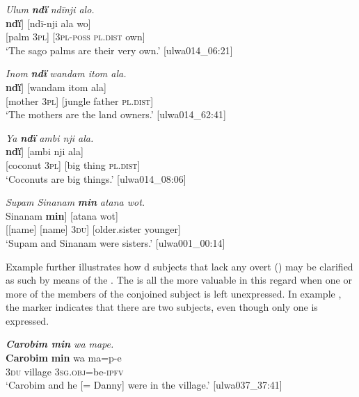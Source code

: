 \ea%
    \label{ex:det:13}
          \textit{Ulum} \textbf{\textit{ndï}} \textit{ndïnji alo.}\\
\gll    {[ulum}  {\textbf{ndï}]}  {[ndï-nji}  ala      {wo]}\\
    {[palm}  {3\textsc{pl}]}  {[3\textsc{pl-poss}}  \textsc{pl.dist}  {own]}\\
\glt    ‘The sago palms are their very own.’ [ulwa014\_06:21]
\z

\ea%
    \label{ex:det:14}
          \textit{Inom} \textbf{\textit{ndï}} \textit{wandam itom ala.}\\
\gll    {[inom}    {\textbf{ndï}]}  {[wandam}  itom  {ala]}\\
    {[mother}  {3\textsc{pl}]}  {[jungle}    father  {\textsc{pl.dist]}}\\
\glt `The mothers are the land owners.’ [ulwa014\_62:41]
\z

\ea%
    \label{ex:det:15}
          \textit{Ya} \textbf{\textit{ndï}} \textit{ambi nji ala.}\\
\gll    {[ya}      {\textbf{ndï}]}  {[ambi}   nji    {ala]}\\
    {[coconut}  {3\textsc{pl]}}  {[big}  thing  {\textsc{pl.dist]}}\\
\glt `Coconuts are big things.’ [ulwa014\_08:06]
\z

\ea%
    \label{ex:det:16}
          \textit{Supam Sinanam} \textbf{\textit{min}} \textit{atana wot.}\\
\gll    {[Supam}  Sinanam  {\textbf{min}]}  {[atana}      {wot]}\\
    {[[name]}  {[name]}    {3\textsc{du]}}  {[older.sister}  {younger]}\\
\glt `Supam and Sinanam were sisters.’ [ulwa001\_00:14]
\z

Example  further illustrates how d subjects that lack any overt  () may be clarified as such by means of the . The  is all the more valuable in this regard when one or more of the members of the conjoined subject is left unexpressed. In example , the  marker indicates that there are two subjects, even though only one is expressed.




\ea%
    \label{ex:det:17}
          \textit{\textbf{Carobim min} wa mape.}\\
\gll    \textbf{Carobim}  \textbf{min}  wa    ma=p-e\\
    [name]    3\textsc{du}  village  3\textsc{sg.obj}=be\textsc{{}-ipfv}\\
\glt `Carobim and he [= Danny] were in the village.’ [ulwa037\_37:41]
\z


